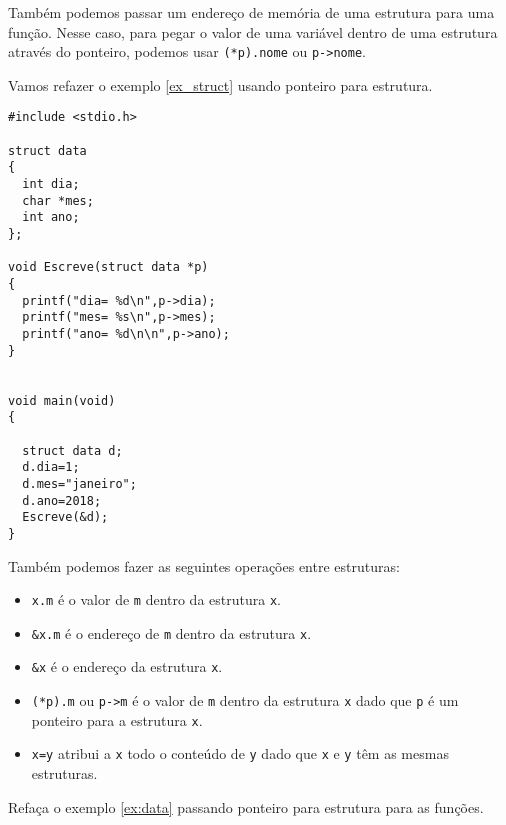 Também podemos passar um endereço de memória de uma estrutura para uma função. Nesse caso, para pegar o valor de uma variável dentro de uma estrutura através do ponteiro, podemos usar \verb|(*p).nome| ou \verb|p->nome|.
\begin{ex}
Vamos refazer o exemplo \ref{ex_struct} usando ponteiro para estrutura.
\end{ex}
\begin{verbatim}
#include <stdio.h>

struct data
{
  int dia;
  char *mes;
  int ano;
};

void Escreve(struct data *p)
{
  printf("dia= %d\n",p->dia);
  printf("mes= %s\n",p->mes);
  printf("ano= %d\n\n",p->ano);
}


void main(void)
{
  
  struct data d;
  d.dia=1;
  d.mes="janeiro";
  d.ano=2018;
  Escreve(&d);
}
\end{verbatim}
Também podemos fazer as seguintes operações entre estruturas:
\begin{itemize}
 \item \verb|x.m| é o valor de \verb|m| dentro da estrutura \verb|x|.
 \item \verb|&x.m| é o endereço de \verb|m| dentro da estrutura \verb|x|.
 \item \verb|&x| é o endereço da estrutura \verb|x|.
 \item \verb|(*p).m| ou \verb|p->m|  é o valor de \verb|m| dentro da estrutura \verb|x| dado que \verb|p| é um ponteiro para a estrutura \verb|x|.
 \item \verb|x=y| atribui a \verb|x| todo o conteúdo de \verb|y| dado que \verb|x| e \verb|y| têm as mesmas estruturas.
 \end{itemize}
\begin{ex}
Refaça o exemplo \ref{ex:data} passando ponteiro para estrutura para as funções.
\end{ex}

